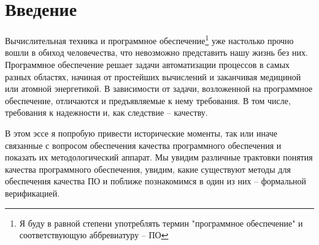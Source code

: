 \section{Введение}

Вычислительная техника и программное обеспечение\footnote{Я буду в равной степени употреблять термин "программное обеспечение" и соответствующую аббревиатуру -- ПО} уже настолько прочно вошли в обиход человечества, что невозможно представить нашу жизнь без них. Программное обеспечение решает задачи автоматизации процессов в самых разных областях, начиная от простейших вычислений и заканчивая медициной или атомной энергетикой. В зависимости от задачи, возложенной на программное обеспечение, отличаются и предъявляемые к нему требования. В том числе, требования к надежности и, как следствие -- качеству.

В этом эссе я попробую привести исторические моменты, так или иначе связанные с вопросом обеспечения качества программного обеспечения и показать их методологический аппарат. Мы увидим различные трактовки понятия качества программного обеспечения, увидим, какие существуют методы для обеспечения качества ПО и поближе познакомимся в один из них -- формальной верификацией.
